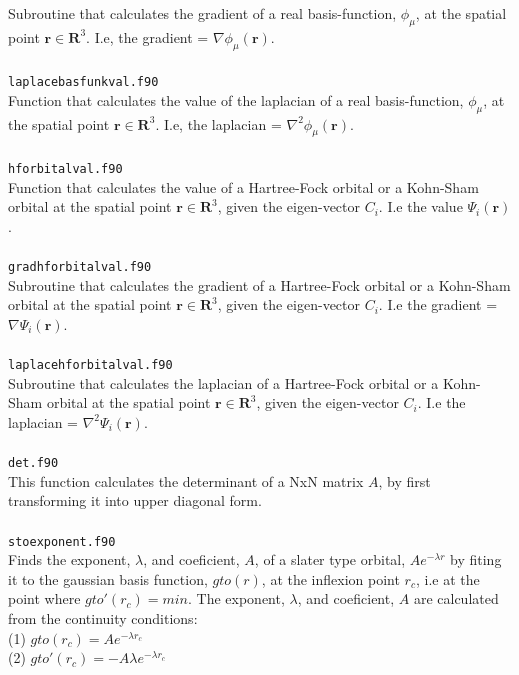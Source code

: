 \documentclass[a4paper,twoside,openany]{book}
\begin{document}
{{Subroutine that calculates  the gradient of a real basis-function, $\phi_{\mu}$, at the spatial
point $\mathbf{r}\in\mathbf{R}^{3}$. I.e, the  gradient = $\nabla \phi_{\mu}(\mathbf{r})$. \\ \\
\texttt{laplacebasfunkval.f90}\\
Function that calculates the value of the laplacian  of a real basis-function, $\phi_{\mu}$, at the spatial
point $\mathbf{r}\in\mathbf{R}^{3}$. I.e, the laplacian = $\nabla^{2} \phi_{\mu}(\mathbf{r})$. \\ \\
\texttt{hforbitalval.f90}\\
Function that calculates the value of a Hartree-Fock orbital or a Kohn-Sham orbital at the spatial point $\mathbf{r}\in\mathbf{R}^{3}$, given 
the eigen-vector $C_{i}$.  I.e the value $\Psi_{i}(\mathbf{r})$. \\ \\
\texttt{gradhforbitalval.f90}\\
Subroutine that calculates the gradient  of a Hartree-Fock orbital or a Kohn-Sham orbital at the spatial point $\mathbf{r}\in\mathbf{R}^{3}$, given 
the eigen-vector $C_{i}$.  I.e the gradient = $\nabla \Psi_{i}(\mathbf{r})$. \\ \\
\texttt{laplacehforbitalval.f90}\\
Subroutine that calculates the laplacian  of a Hartree-Fock orbital or a Kohn-Sham orbital at the spatial point $\mathbf{r}\in\mathbf{R}^{3}$, given 
the eigen-vector $C_{i}$.  I.e the laplacian = $\nabla^{2} \Psi_{i}(\mathbf{r})$. \\ \\
\texttt{det.f90} \\
This function calculates the determinant of a NxN matrix $A$, by first transforming it into upper diagonal form. \\ \\
\newpage
\noindent
\texttt{stoexponent.f90}\\
Finds the exponent, $\lambda$, and coeficient, $A$,  of a slater type orbital, $Ae^{-\lambda r}$ 
by fiting it to the gaussian basis function, $gto( r )$, at the inflexion
point $r_{c}$, i.e at the point where $gto'(r_{c}) = min$. The
exponent, $\lambda$, and coeficient, $A$ are calculated from the
continuity conditions:\\
(1)  $gto(r_{c}) = Ae^{-\lambda r_{c}}$\\
(2)  $gto'(r_{c}) = -A\lambda e^{-\lambda r_{c}}$\\
}}
\end{document}
